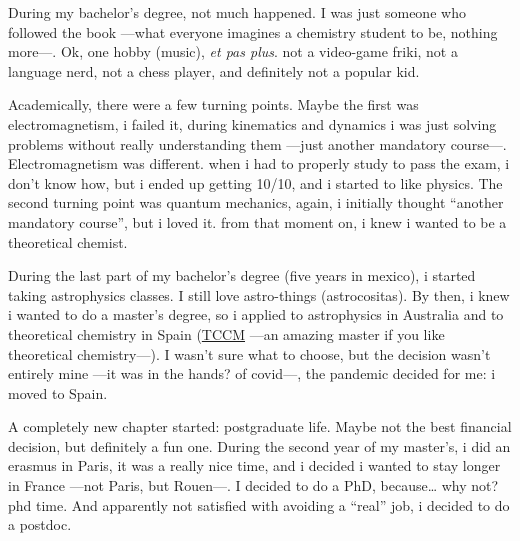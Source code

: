 
During my bachelor's degree, not much happened. I was just someone who
followed the book ---what everyone imagines a chemistry student to be,
nothing more---. Ok, one hobby (music), \textit{et pas plus}. not a video-game friki,
not a language nerd, not a chess player, and definitely not a popular
kid.

Academically, there were a few turning points. Maybe the first was
electromagnetism, i failed it, during kinematics and dynamics i was just
solving problems without really understanding them ---just another mandatory
course---. Electromagnetism was different. when i had to properly study to
pass the exam, i don't know how, but i ended up getting 10/10, and i
started to like physics. The second turning point was quantum mechanics,
again, i initially thought ``another mandatory course'', but i loved it. from
that moment on, i knew i wanted to be a theoretical chemist.

During the last part of my bachelor's degree (five years in mexico), i
started taking astrophysics classes. I still love astro-things
(astrocositas). By then, i knew i wanted to do a master's degree, so i
applied to astrophysics in Australia and to theoretical chemistry in Spain
(\href{https://www.emtccm.org}{TCCM} ---an amazing master if you like theoretical chemistry---). I wasn't sure
what to choose, but the decision wasn't entirely mine ---it was in the
hands? of covid---, the pandemic decided for me: i moved to Spain.

A completely new chapter started: postgraduate life. Maybe not the best
financial decision, but definitely a fun one. During the second year of my
master's, i did an erasmus in Paris, it was a really nice time, and i
decided i wanted to stay longer in France ---not Paris, but Rouen---. I decided
to do a PhD, because\ldots{} why not? phd time. And apparently not satisfied with
avoiding a ``real'' job, i decided to do a postdoc.

